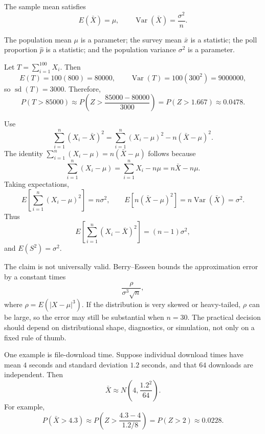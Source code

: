 \begin{solproblema}[prob:22013b6]
The sample mean satisfies
\[
	E(\bar X)=\mu,\qquad \operatorname{Var}(\bar X)=\frac{\sigma^2}{n}.
\]
\end{solproblema}

\begin{solproblema}[prob:f4e7b8b]
The population mean $\mu$ is a parameter; the survey mean $\bar x$ is a statistic; the poll proportion $\hat p$ is a statistic; and the population variance $\sigma^2$ is a parameter.
\end{solproblema}

\begin{solproblema}[prob:6815de7]
Let $T=\sum_{i=1}^{100}X_i$. Then
\[
	E(T)=100(800)=80000,\qquad \operatorname{Var}(T)=100(300^2)=9000000,
\]
so $\operatorname{sd}(T)=3000$. Therefore,
\[
	P(T>85000)\approx P\left(Z>\frac{85000-80000}{3000}\right)
	=P(Z>1.667)\approx 0.0478.
\]
\end{solproblema}

\begin{solproblema}[prob:716e9bb]
Use
\[
	\sum_{i=1}^n(X_i-\bar X)^2
	=\sum_{i=1}^n(X_i-\mu)^2-n(\bar X-\mu)^2.
\]
The identity $\sum_{i=1}^n(X_i-\mu)=n(\bar X-\mu)$ follows because
\[
	\sum_{i=1}^n(X_i-\mu)=\sum_{i=1}^n X_i-n\mu=n\bar X-n\mu.
\]
Taking expectations,
\[
	E\left[\sum_{i=1}^n(X_i-\mu)^2\right]=n\sigma^2,\qquad
	E\left[n(\bar X-\mu)^2\right]=n\operatorname{Var}(\bar X)=\sigma^2.
\]
Thus
\[
	E\left[\sum_{i=1}^n(X_i-\bar X)^2\right]=(n-1)\sigma^2,
\]
and $E(S^2)=\sigma^2$.
\end{solproblema}

\begin{solproblema}[prob:0555e27]
The claim is not universally valid. Berry--Esseen bounds the approximation error by a constant times
\[
	\frac{\rho}{\sigma^3\sqrt n},
\]
where $\rho=E(|X-\mu|^3)$. If the distribution is very skewed or heavy-tailed, $\rho$ can be large, so the error may still be substantial when $n=30$. The practical decision should depend on distributional shape, diagnostics, or simulation, not only on a fixed rule of thumb.
\end{solproblema}

\begin{solproblema}[prob:2e2f544]
One example is file-download time. Suppose individual download times have mean $4$ seconds and standard deviation $1.2$ seconds, and that $64$ downloads are independent. Then
\[
	\bar X\approx N\left(4,\frac{1.2^2}{64}\right).
\]
For example,
\[
	P(\bar X>4.3)\approx P\left(Z>\frac{4.3-4}{1.2/8}\right)=P(Z>2)\approx 0.0228.
\]
\end{solproblema}
